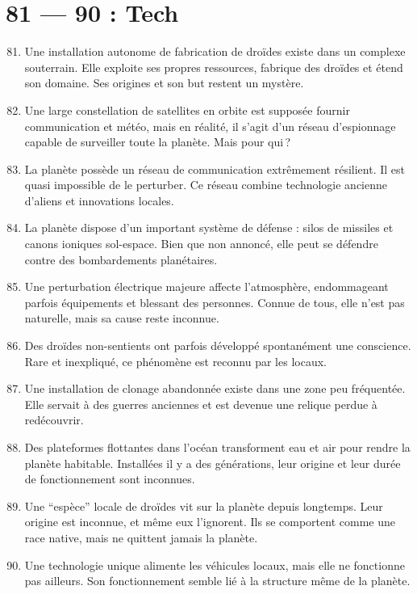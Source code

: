\documentclass{article}
\begin{document}
\section*{81 --- 90 : Tech}
\begin{enumerate}
	\setcounter{enumi}{80}
	\item Une installation autonome de fabrication de droïdes existe dans un complexe souterrain. Elle exploite ses propres ressources, fabrique des droïdes et étend son domaine. Ses origines et son but restent un mystère.
	\item Une large constellation de satellites en orbite est supposée fournir communication et météo, mais en réalité, il s’agit d’un réseau d’espionnage capable de surveiller toute la planète. Mais pour qui ?
	\item La planète possède un réseau de communication extrêmement résilient. Il est quasi impossible de le perturber. Ce réseau combine technologie ancienne d’aliens et innovations locales.
	\item La planète dispose d’un important système de défense : silos de missiles et canons ioniques sol-espace. Bien que non annoncé, elle peut se défendre contre des bombardements planétaires.
	\item Une perturbation électrique majeure affecte l’atmosphère, endommageant parfois équipements et blessant des personnes. Connue de tous, elle n’est pas naturelle, mais sa cause reste inconnue.
	\item Des droïdes non-sentients ont parfois développé spontanément une conscience. Rare et inexpliqué, ce phénomène est reconnu par les locaux.
	\item Une installation de clonage abandonnée existe dans une zone peu fréquentée. Elle servait à des guerres anciennes et est devenue une relique perdue à redécouvrir.
	\item Des plateformes flottantes dans l’océan transforment eau et air pour rendre la planète habitable. Installées il y a des générations, leur origine et leur durée de fonctionnement sont inconnues.
	\item Une “espèce” locale de droïdes vit sur la planète depuis longtemps. Leur origine est inconnue, et même eux l’ignorent. Ils se comportent comme une race native, mais ne quittent jamais la planète.
	\item Une technologie unique alimente les véhicules locaux, mais elle ne fonctionne pas ailleurs. Son fonctionnement semble lié à la structure même de la planète.
\end{enumerate}
\end{document}
